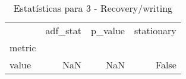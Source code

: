 \begin{table}[htbp]
\caption{Estatísticas para 3 - Recovery/writing}
\label{tab:3_-_recovery_writing_adf_test}
\begin{tabular}{lrrr}
\toprule
 & adf_stat & p_value & stationary \\
metric &  &  &  \\
\midrule
value & NaN & NaN & False \\
\bottomrule
\end{tabular}
\end{table}
